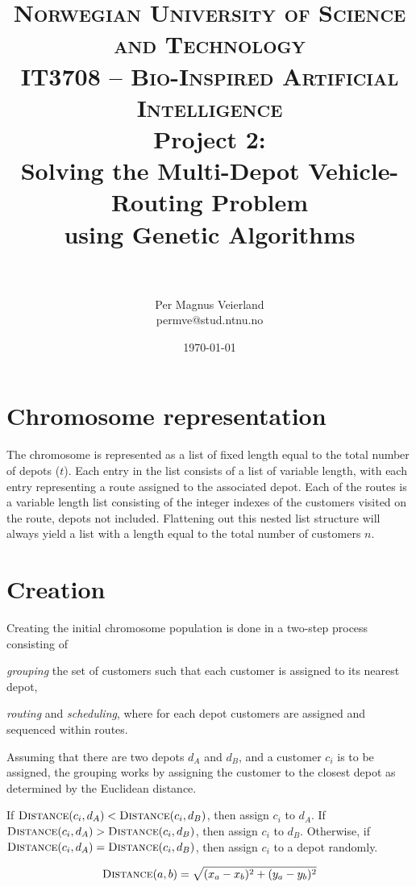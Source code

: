 \documentclass[paper=a4, fontsize=10pt]{scrartcl}
\title{
\vspace{-1cm}
\normalfont \normalsize
\textsc{Norwegian University of Science and Technology\\IT3708 -- Bio-Inspired Artificial Intelligence}
\horrule{0.5pt} \\[0cm]
\Huge Project 2:\\ Solving the Multi-Depot Vehicle-Routing Problem\\using Genetic Algorithms\\[-0.3cm]
\horrule{2pt} \\[0.1cm]
}
\author{Per Magnus Veierland\\permve@stud.ntnu.no}
\date{\normalsize\today}
\begin{document}
\maketitle

\begin{multicols}{2}

\section*{Chromosome representation}

The chromosome is represented as a list of fixed length equal to the total number of depots ($t$). Each entry in the list consists of a list of variable length, with each entry representing a route assigned to the associated depot. Each of the routes is a variable length list consisting of the integer indexes of the customers visited on the route, depots not included. Flattening out this nested list structure will always yield a list with a length equal to the total number of customers $n$.

\section*{Creation}

Creating the initial chromosome population is done in a two-step process consisting of
\begin{enumerate*}[label=\alph*)]
    \item \textit{grouping} the set of customers such that each customer is assigned to its nearest depot,
    \item \textit{routing} and \textit{scheduling}, where for each depot customers are assigned and sequenced within routes.
\end{enumerate*}

Assuming that there are two depots $d_A$ and $d_B$, and a customer $c_i$ is to be assigned, the grouping works by assigning the customer to the closest depot as determined by the Euclidean distance.

If $\textsc{Distance}(c_i, d_A) < \textsc{Distance}(c_i, d_B)$, then assign $c_i$ to $d_A$. If $\textsc{Distance}(c_i, d_A) > \textsc{Distance}(c_i, d_B)$, then assign $c_i$ to $d_B$. Otherwise, if $\textsc{Distance}(c_i, d_A) = \textsc{Distance}(c_i, d_B)$, then assign $c_i$ to a depot randomly.

\begin{equation}
\textsc{Distance}(a, b) = \sqrt{(x_a - x_b)^2 + (y_a - y_b)^2}
\end{equation}


\end{multicols}
\end{document}
